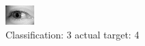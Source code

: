 \begin{figure}[h!]
\begin{center}
\includegraphics[width=0.60\columnwidth]{figures/ID3119_class_3_target_4.png}
\end{center}
\caption{ Classification: 3 actual target: 4}
\label{fig:ID3119_class_3_target_4}
\end{figure}
